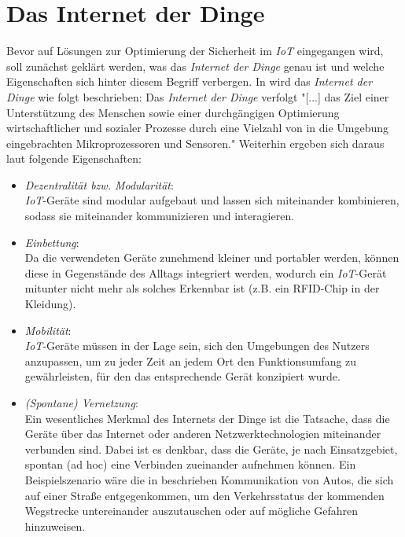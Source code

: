 \documentclass[conference]{IEEEtran}
\begin{document}
\section{Das Internet der Dinge}
Bevor auf Lösungen zur Optimierung der Sicherheit im \textit{IoT} eingegangen wird, soll zunächst geklärt werden, was das \textit{Internet der Dinge} genau ist und welche Eigenschaften sich hinter diesem Begriff verbergen. In \cite{fried} wird das \textit{Internet der Dinge} wie folgt beschrieben: Das \textit{Internet der Dinge} verfolgt "[...] das Ziel einer Unterstützung des Menschen sowie einer durchgängigen Optimierung wirtschaftlicher und sozialer Prozesse durch eine Vielzahl von in die Umgebung eingebrachten Mikroprozessoren und Sensoren." Weiterhin ergeben sich daraus laut \cite{fried} folgende Eigenschaften:
\begin{itemize}
  \item \textit{Dezentralität bzw. Modularität}: \\
  \textit{IoT}-Geräte sind modular aufgebaut und lassen sich miteinander kombinieren, sodass sie miteinander kommunizieren und interagieren. \newline
  \item \textit{Einbettung}: \\
  Da die verwendeten Geräte zunehmend kleiner und portabler werden, können diese in Gegenstände des Alltags integriert werden, wodurch ein \textit{IoT}-Gerät mitunter nicht mehr als solches Erkennbar ist (z.B. ein RFID-Chip in der Kleidung). \newline
  \item \textit{Mobilität}: \\
  \textit{IoT}-Geräte müssen in der Lage sein, sich den Umgebungen des Nutzers anzupassen, um zu jeder Zeit an jedem Ort den Funktionsumfang zu gewährleisten, für den das entsprechende Gerät konzipiert wurde. \newline
  \item \textit{(Spontane) Vernetzung}: \\
  Ein wesentliches Merkmal des Internets der Dinge ist die Tatsache, dass die Geräte über das Internet oder anderen Netzwerktechnologien miteinander verbunden sind. Dabei ist es denkbar, dass die Geräte, je nach Einsatzgebiet, spontan (ad hoc) eine Verbinden zueinander aufnehmen können. Ein Beispielszenario wäre die in \cite{adhoc} beschrieben Kommunikation von Autos, die sich auf einer Straße entgegenkommen, um den Verkehrsstatus der kommenden Wegstrecke untereinander auszutauschen oder auf mögliche Gefahren hinzuweisen. \newline

\end{itemize}
\end{document}

